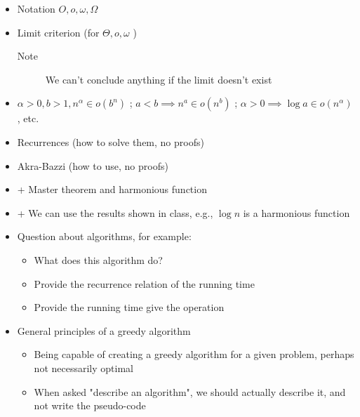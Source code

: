 \begin{itemize}
    \item Notation $O,o,\omega,\Omega$
    \item Limit criterion (for  $\Theta, o, \omega$ )
	\begin{description}
	    \item[Note] We can't conclude anything if the limit doesn't exist
	\end{description}
    \item $\alpha>0, b>1, n^{\alpha} \in o(b^{n})$ ; $a < b \implies n^{a}\in o(n^{b})$ ; $\alpha>0 \implies\log a \in o(n^{\alpha})$, etc.
\end{itemize}

\begin{itemize}
    \item Recurrences (how to solve them, no proofs)
\end{itemize}

\begin{itemize}
    \item Akra-Bazzi (how to use, no proofs)
    \item + Master theorem and harmonious function
    \item + We can use the results shown in class, e.g., $\log n$ is a harmonious function
\end{itemize}

\begin{itemize}
    \item Question about algorithms, for example:
	\begin{itemize}
	    \item What does this algorithm do?
	    \item Provide the recurrence relation of the running time
	    \item Provide the running time give the operation
	\end{itemize}
\end{itemize}

\begin{itemize}
    \item General principles of a greedy algorithm
	\begin{itemize}
	    \item Being capable of creating a greedy algorithm for a given problem, perhaps not necessarily optimal
	    \item When asked "describe an algorithm", we should actually describe it, and not write the pseudo-code
	\end{itemize}
\end{itemize}

